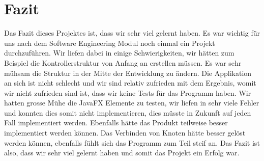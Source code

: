 \chapter{Fazit}
\label{chap:fazit}
Das Fazit dieses Projektes ist, dass wir sehr viel gelernt haben. Es war wichtig für uns nach dem Software Engineering Modul noch einmal ein Projekt durchzuführen. Wir liefen dabei in einige Schwierigkeiten, wir hätten zum Beispiel die Kontrollerstruktur von Anfang an erstellen müssen. Es war sehr mühsam die Struktur in der Mitte der Entwicklung zu ändern. Die Applikation an sich ist nicht schlecht und wir sind relativ zufrieden mit dem Ergebnis, womit wir nicht zufrieden sind ist, dass wir keine Tests für das Programm haben. Wir hatten grosse Mühe die JavaFX Elemente zu testen, wir liefen in sehr viele Fehler und konnten dies somit nicht implementieren, dies müsste in Zukunft auf jeden Fall implementiert werden.
Ebenfalls hätte das Produkt teilweise besser implementiert werden können. Das Verbinden von Knoten hätte besser gelöst werden können, ebenfalls fühlt sich das Programm zum Teil steif an. Das Fazit ist also, dass wir sehr viel gelernt haben und somit das Projekt ein Erfolg war.